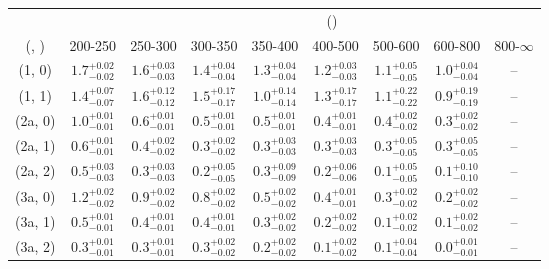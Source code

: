 \begin{table}[h!]
\tiny
\centering
{}
\begin{tabular}
{ccccccccc}
	\hline\hline
&	& \multicolumn{8}{c}{\scalht (\gev)} \\ 
	 (\njet,  \nb) & 200-250 & 250-300 & 300-350 & 350-400 & 400-500 & 500-600 & 600-800 & 800-$\infty$ \\ [0.8ex] 
\hline
	(1, 0) & $1.7^{+ 0.02 }_{- 0.02 }$ & $1.6^{+ 0.03 }_{- 0.03 }$ & $1.4^{+ 0.04 }_{- 0.04 }$ & $1.3^{+ 0.04 }_{- 0.04 }$ & $1.2^{+ 0.03 }_{- 0.03 }$ & $1.1^{+ 0.05 }_{- 0.05 }$ & $1.0^{+ 0.04 }_{- 0.04 }$ & -- \\[0.5ex] 
	(1, 1) & $1.4^{+ 0.07 }_{- 0.07 }$ & $1.6^{+ 0.12 }_{- 0.12 }$ & $1.5^{+ 0.17 }_{- 0.17 }$ & $1.0^{+ 0.14 }_{- 0.14 }$ & $1.3^{+ 0.17 }_{- 0.17 }$ & $1.1^{+ 0.22 }_{- 0.22 }$ & $0.9^{+ 0.19 }_{- 0.19 }$ & -- \\[0.5ex] 
	(2a, 0) & $1.0^{+ 0.01 }_{- 0.01 }$ & $0.6^{+ 0.01 }_{- 0.01 }$ & $0.5^{+ 0.01 }_{- 0.01 }$ & $0.5^{+ 0.01 }_{- 0.01 }$ & $0.4^{+ 0.01 }_{- 0.01 }$ & $0.4^{+ 0.02 }_{- 0.02 }$ & $0.3^{+ 0.02 }_{- 0.02 }$ & -- \\[0.5ex] 
	(2a, 1) & $0.6^{+ 0.01 }_{- 0.01 }$ & $0.4^{+ 0.02 }_{- 0.02 }$ & $0.3^{+ 0.02 }_{- 0.02 }$ & $0.3^{+ 0.03 }_{- 0.03 }$ & $0.3^{+ 0.03 }_{- 0.03 }$ & $0.3^{+ 0.05 }_{- 0.05 }$ & $0.3^{+ 0.05 }_{- 0.05 }$ & -- \\[0.5ex] 
	(2a, 2) & $0.5^{+ 0.03 }_{- 0.03 }$ & $0.3^{+ 0.03 }_{- 0.03 }$ & $0.2^{+ 0.05 }_{- 0.05 }$ & $0.3^{+ 0.09 }_{- 0.09 }$ & $0.2^{+ 0.06 }_{- 0.06 }$ & $0.1^{+ 0.05 }_{- 0.05 }$ & $0.1^{+ 0.10 }_{- 0.10 }$ & -- \\[0.5ex] 
	(3a, 0) & $1.2^{+ 0.02 }_{- 0.02 }$ & $0.9^{+ 0.02 }_{- 0.02 }$ & $0.8^{+ 0.02 }_{- 0.02 }$ & $0.5^{+ 0.02 }_{- 0.02 }$ & $0.4^{+ 0.01 }_{- 0.01 }$ & $0.3^{+ 0.02 }_{- 0.02 }$ & $0.2^{+ 0.02 }_{- 0.02 }$ & -- \\[0.5ex] 
	(3a, 1) & $0.5^{+ 0.01 }_{- 0.01 }$ & $0.4^{+ 0.01 }_{- 0.01 }$ & $0.4^{+ 0.01 }_{- 0.01 }$ & $0.3^{+ 0.02 }_{- 0.02 }$ & $0.2^{+ 0.02 }_{- 0.02 }$ & $0.1^{+ 0.02 }_{- 0.02 }$ & $0.1^{+ 0.02 }_{- 0.02 }$ & -- \\[0.5ex] 
	(3a, 2) & $0.3^{+ 0.01 }_{- 0.01 }$ & $0.3^{+ 0.01 }_{- 0.01 }$ & $0.3^{+ 0.02 }_{- 0.02 }$ & $0.2^{+ 0.02 }_{- 0.02 }$ & $0.1^{+ 0.02 }_{- 0.02 }$ & $0.1^{+ 0.04 }_{- 0.04 }$ & $0.0^{+ 0.01 }_{- 0.01 }$ & -- \\[0.5ex] 

\end{tabular}
\end{table}
